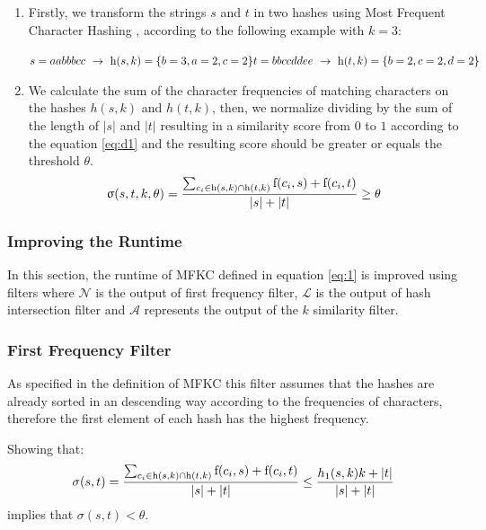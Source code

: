\begin{enumerate}
	\item Firstly, we transform the strings $s$ and $t$ in two hashes using Most Frequent Character Hashing \cite{seker2014novel}, according to the following example with $k=3$:
	
	$s=aabbbcc \ \rightarrow \ \h{s,k}=\{b=3,a=2,c=2\} \\
	t=bbccddee \ \rightarrow \ \h{t,k}=\{b=2,c=2,d=2\}$
	
	\item We calculate the sum of the character frequencies of matching characters on the hashes $h(s,k)$ and $h(t,k)$, then, we normalize dividing by the sum of the length of $|s|$ and $|t|$ resulting in a similarity score from $0$ to $1$ according to the equation \ref{eq:d1} and the resulting score should be greater or equals the threshold $\theta$.
	\begin{equation} \label{eq:d1}
		\upsigma(s,t,k,\theta) = \frac{\sum_{c_i \in \textnormal{h}(s,k) \cap \textnormal{h}(t,k)} \textnormal{f}(c_i,s)+\textnormal{f}(c_i,t)}{|s|+|t|} \geq \theta
	\end{equation}
	
\end{enumerate}

\subsubsection{Improving the Runtime}


In this section, the runtime of MFKC defined in equation \ref{eq:1} is improved using filters where $\mathcal{N}$ is the output of first frequency filter, $\mathcal{L}$ is the output of hash intersection filter and $\mathcal{A}$ represents the output of the $k$ similarity filter. 

\subsubsection{First Frequency Filter} \label{fff}

As specified in the definition of MFKC \cite{seker2014novel} this filter assumes that the hashes are already sorted in an descending way according to the frequencies of characters, therefore the first element of each hash has the highest frequency.

\begin{theorem} \label{thr:ff1}
Showing that:
\begin{equation} \label{eq:ff1}
	\sigma(s,t)= \frac
	{\sum_{c_i \in \textnormal{h}(s,k) \cap \textnormal{h}(t,k)} \textnormal{f}(c_i,s)+\textnormal{f}(c_i,t)}
	{|s|+|t|} \leq \frac{h_1(s,k) k + |t|}{|s| + |t|}
\end{equation}
implies that $\sigma(s,t) < \theta$.
\end{theorem}

